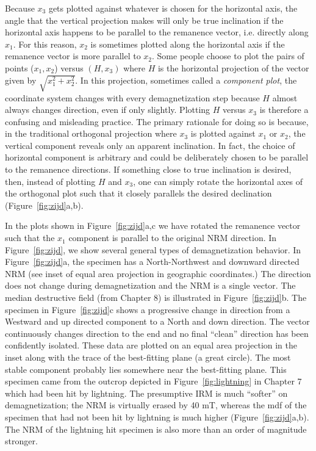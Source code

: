 Because $x_3$ gets plotted against whatever is chosen for the horizontal axis, the angle that the vertical projection makes will only be true inclination if the horizontal axis happens to be parallel to the remanence vector, i.e. directly along $x_1$.  For this reason, $x_2$ is sometimes plotted along the horizontal axis if the remanence vector is more parallel to $x_2$.    Some people choose to plot the pairs of points ($x_1,x_2$) versus $(H,x_3)$
where $H$ is the horizontal projection of the vector 
given by $\sqrt{x_1^2+x_2^2}$.  In this projection, 
sometimes called a {\it component plot}, the coordinate system changes
with every demagnetization step because $H$ almost always changes direction,
even if only slightly.  
Plotting $H$ versus $x_3$ is therefore a confusing and misleading practice. 
The primary rationale for doing so is because, in the traditional orthogonal projection where $x_3$ is plotted against $x_1$ or $x_2$, the vertical component 
reveals only an apparent inclination.  
In fact, the choice of horizontal component is arbitrary and could be deliberately chosen to be parallel to the remanence directions.   If something close to true inclination is desired, then, instead of plotting $H$ and $x_3$,
one can simply rotate the horizontal axes of the orthogonal plot such that it 
closely parallels the desired declination (Figure~\ref{fig:zijd}a,b).

 In the plots shown in Figure~\ref{fig:zijd}a,c we have rotated the remanence vector such that the $x_1$  component is parallel to the original NRM direction. 
In Figure~\ref{fig:zijd}, we show several general types of demagnetization behavior.  In 
Figure~\ref{fig:zijd}a,
the specimen has a North-Northwest and downward directed  NRM (see inset of equal area projection  in geographic coordinates.)  The direction does not change during demagnetization and the NRM is 
a single vector.       The median destructive field (from Chapter  8) is illustrated in Figure~\ref{fig:zijd}b.   
The specimen in Figure~\ref{fig:zijd}c shows a progressive change in direction from
a Westward and up directed component to a North and down
 direction.  The vector continuously changes direction to the end and no
final ``clean'' direction has been confidently isolated.  
These data are plotted on an equal area projection in the inset along with the trace of the  best-fitting plane (a great circle).
 The most stable
component probably lies somewhere near the best-fitting plane.    This specimen came from the outcrop depicted in Figure~\ref{fig:lightning} in Chapter 7 which had been hit by lightning.  The  presumptive IRM is much ``softer'' on demagnetization; the NRM is virtually erased by 40 mT, whereas the mdf of  the specimen that had not been hit by lightning is much higher (Figure~\ref{fig:zijd}a,b).  The NRM of the lightning hit specimen is  also more than an  order of magnitude stronger. 

